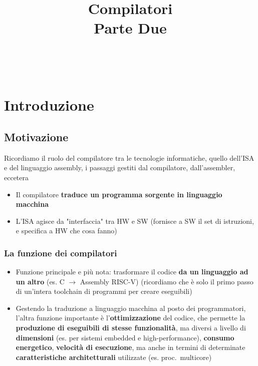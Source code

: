 

\title{%
  Compilatori\\
\large Parte Due}


\maketitle
\tableofcontents
\newpage~
\newpage
\section{Introduzione}

\subsection{Motivazione}

Ricordiamo il ruolo del compilatore tra le tecnologie informatiche, quello dell'ISA e del linguaggio assembly, i passaggi gestiti dal compilatore, dall'assembler, eccetera
\begin{itemize}
  \item Il compilatore \textbf{traduce un programma sorgente in linguaggio macchina}
  \item L'ISA agisce da "interfaccia" tra HW e SW (fornisce a SW il set di istruzioni, e specifica a HW che cosa fanno)
\end{itemize}

\subsubsection{La funzione dei compilatori}

\begin{itemize}
  \item Funzione principale e pi\`u nota: trasformare il codice \textbf{da un linguaggio ad un altro} (es. C $\rightarrow$ Assembly RISC-V) (ricordiamo che \`e solo il primo passo di un'intera toolchain di programmi per creare eseguibili)

  \item Gestendo la traduzione a linguaggio macchina al posto dei programmatori, l'altra funzione importante \`e l'\textbf{ottimizzazione} del codice, che permette la \textbf{produzione di eseguibili di stesse funzionalit\`a}, ma diversi a livello di \textbf{dimensioni} (es. per sistemi embedded e high-performance), \textbf{consumo energetico}, \textbf{velocit\`a di esecuzione}, ma anche in termini di determinate \textbf{caratteristiche architetturali} utilizzate (es. proc.~multicore)
\end{itemize}


